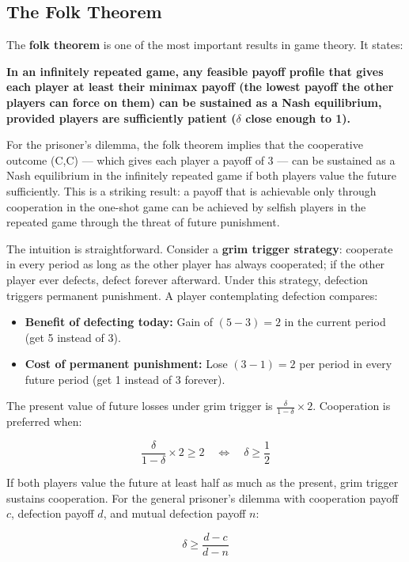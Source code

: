 \documentclass[12pt, letterpaper]{article}
\begin{document}
\subsection{The Folk Theorem}


The \textbf{folk theorem} is one of the most important results in game theory. It states:

\textbf{In an infinitely repeated game, any feasible payoff profile that gives each player at least their minimax payoff (the lowest payoff the other players can force on them) can be sustained as a Nash equilibrium, provided players are sufficiently patient ($\delta$ close enough to 1).}

For the prisoner's dilemma, the folk theorem implies that the cooperative outcome (C,C) --- which gives each player a payoff of 3 --- can be sustained as a Nash equilibrium in the infinitely repeated game if both players value the future sufficiently. This is a striking result: a payoff that is achievable only through cooperation in the one-shot game can be achieved by selfish players in the repeated game through the threat of future punishment.

The intuition is straightforward. Consider a \textbf{grim trigger strategy}: cooperate in every period as long as the other player has always cooperated; if the other player ever defects, defect forever afterward. Under this strategy, defection triggers permanent punishment. A player contemplating defection compares:

\begin{itemize}
\item \textbf{Benefit of defecting today:} Gain of $(5 - 3) = 2$ in the current period (get 5 instead of 3).
\item \textbf{Cost of permanent punishment:} Lose $(3 - 1) = 2$ per period in every future period (get 1 instead of 3 forever).
\end{itemize}

The present value of future losses under grim trigger is $\frac{\delta}{1-\delta} \times 2$. Cooperation is preferred when:

$$\frac{\delta}{1-\delta} \times 2 \geq 2 \quad \Leftrightarrow \quad \delta \geq \frac{1}{2}$$

If both players value the future at least half as much as the present, grim trigger sustains cooperation. For the general prisoner's dilemma with cooperation payoff $c$, defection payoff $d$, and mutual defection payoff $n$:

$$\delta \geq \frac{d - c}{d - n}$$
\end{document}
